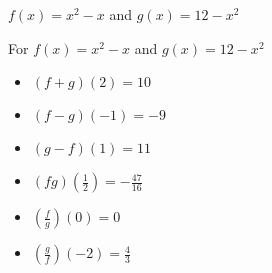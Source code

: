 {$f(x) = x^2 - x$ and  $g(x) = 12-x^2$}
{For  $f(x) = x^2 - x$ and  $g(x) = 12-x^2$

\begin{multicols}{2}
\begin{itemize}
\item  $(f+g)(2) = 10$
\item  $(f-g)(-1) = -9$
\item  $(g-f)(1) = 11$
\item  $(fg)\left(\frac{1}{2}\right) = -\frac{47}{16}$
\item  $\left(\frac{f}{g}\right)(0) = 0$
\item  $\left(\frac{g}{f}\right)\left(-2\right) = \frac{4}{3}$
\end{itemize}
\end{multicols}
}